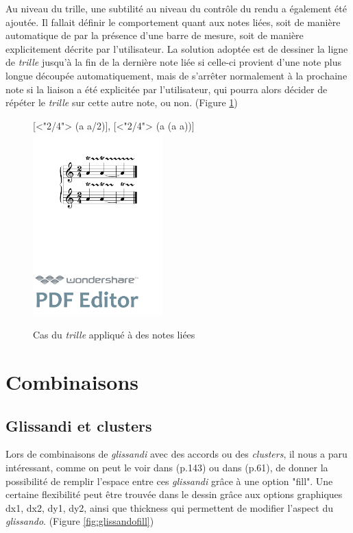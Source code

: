 \documentclass{article}
\newenvironment{gmncode}	{\vspace{-2mm}\small\verbatim}{\endverbatim\vspace{-2mm}}
\begin{document}

Au niveau du trille, une subtilité au niveau du contr\^ole du rendu a également été ajoutée. Il fallait définir le comportement quant aux notes liées, soit de manière automatique de par la présence d'une barre de mesure, soit de manière explicitement décrite par l'utilisateur. La solution adoptée est de dessiner la ligne de \emph{trille} jusqu'à la fin de la dernière note liée si celle-ci provient d'une note plus longue découpée automatiquement, mais de s'arrêter normalement à la prochaine note si la liaison a été explicitée par l'utilisateur, qui pourra alors décider de répéter le \emph{trille} sur cette autre note, ou non. (Figure \ref{fig:trill})

\begin{figure}[h]
\centering
\begin{gmncode}
{
  [\meter<"2/4"> \trill({a} {a/2})],
  [\meter<"2/4"> \trill({a} \tie({a} {a}))]
}
\end{gmncode}
\includegraphics[width=5cm]{img/trill.pdf}
\caption{Cas du \emph{trille} appliqué à des notes liées}
\label{fig:trill}
\end{figure}

\section{Combinaisons}\label{sec:combinaisons}

\subsection{Glissandi et clusters}\label{subsec:glissandiCluster}

Lors de combinaisons de \emph{glissandi}  avec des accords ou des \emph{clusters}, il nous a paru intéressant, comme on peut le voir dans \cite{gould2011behind} (p.143) ou dans \cite{stone1980music} (p.61), de donner la possibilité de remplir l'espace entre ces \emph{glissandi} grâce à une option "fill". Une certaine flexibilité peut être trouvée dans le dessin grâce aux options graphiques dx1, dx2, dy1, dy2, ainsi que thickness qui permettent de modifier l'aspect du \emph{glissando}. (Figure \ref{fig:glissandofill})
\end{document}
